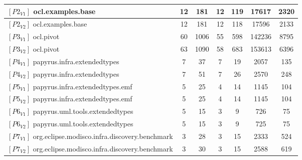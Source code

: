 \begin{table*}[t]
{\begin{tabular}{lcccccc}
$[P2_{V1}]$ ocl.examples.base & 12 & 181 & 12 &119 &17617 & 2320 \\ \midrule

$[P2_{V2}]$ ocl.examples.base & 12 & 181 & 12 & 118&17596 & 2133 \\ \midrule


$[P3_{V1}]$ ocl.pivot & 60 & 1006 & 55 &598 & 142236& 8795 \\ \midrule

$[P3_{V2}]$ ocl.pivot & 63 & 1090 & 58 & 683&153613 & 6396 \\ \midrule


$[P4_{V1}]$ papyrus.infra.extendedtypes & 7 & 37 &7  & 19 & 2057 & 135 \\ \midrule

$[P4_{V2}]$ papyrus.infra.extendedtypes & 7 & 51 & 7 &26 &  2570 & 248 \\\midrule
$[P5_{V1}]$ papyrus.infra.extendedtypes.emf & 5 & 25 &4  & 14 & 1145 & 104 \\ \midrule

$[P5_{V2}]$ papyrus.infra.extendedtypes.emf & 5 & 25 & 4 &14 &  1145& 104 \\ \midrule
$[P6_{V1}]$ papyrus.uml.tools.extendedtypes & 5 & 15 &3  & 9 & 726 & 75 \\ \midrule

$[P6_{V2}]$ papyrus.uml.tools.extendedtypes & 5 & 15 & 3 &9 &  725& 75 \\ \midrule

$[P7_{V1}]$ org.eclipse.modisco.infra.discovery.benchmark & 3 &  28& 3 &15 & 2333 &524  \\ \midrule

$[P7_{V2}]$ org.eclipse.modisco.infra.discovery.benchmark &3  & 30 &3  & 15&  2588& 619 \\%



\end{tabular}}
\end{table*}
